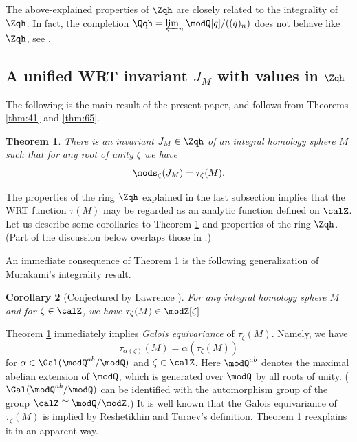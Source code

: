 \documentclass{amsart}
\numberwithin{equation}{section}
\numberwithin{figure}{section}
\theoremstyle{plain}
\newtheorem{theorem}{Theorem}[section]
\newtheorem{corollary}[theorem]{Corollary}
\theoremstyle{definition}
\theoremstyle{remark}
\begin{document}
The above-explained properties of $\Zqh$ are closely related to the
integrality of $\Zqh$.  In fact, the completion $\Qqh =
\varprojlim_{n}\modQ [q]/((q)_n)$ does not behave like $\Zqh$, see
\cite[Section 7.5]{H:cyclotomic}.
%
%
%
%
%
%
%
%
%
%
%

\subsection{A unified WRT invariant $J_M$ with values in $\Zqh$}
\label{sec:unif-wrt-invar-1}

The following is the main result of the present paper, and follows
from Theorems \ref{thm:41} and \ref{thm:65}.

\begin{theorem}
  \label{r40}
  There is an invariant $J_M\in \Zqh$ of an integral homology sphere $M$
  such that for any root of unity $\zeta $ we have
  \begin{equation}
    \label{e56}
    \mods _\zeta (J_M) = \tau _\zeta (M).
  \end{equation}
\end{theorem}

The properties of the ring $\Zqh$ explained in the last subsection
implies that the WRT function $\tau (M)$ may be regarded as an analytic
function defined on $\calZ$.  Let us describe some corollaries to
Theorem \ref{r40} and properties of the ring $\Zqh$.  (Part of the
discussion below overlaps those in \cite{H:rims2001,H:cyclotomic}.)

An immediate consequence of Theorem \ref{r40} is the following
generalization of Murakami's integrality result.

\begin{corollary}[Conjectured by Lawrence \cite{Lawrence:integrality}]
  \label{r14}
  For any integral homology sphere $M$ and for $\zeta \in \calZ$, we have
  $\tau _\zeta (M)\in \modZ [\zeta ]$.
\end{corollary}

Theorem \ref{r40} immediately implies {\em Galois equivariance} of
$\tau _\zeta (M)$.  Namely, we have
\begin{equation}
  \label{e67}
  \tau _{\alpha (\zeta )}(M)=\alpha (\tau _\zeta (M))
\end{equation}
for $\alpha \in \Gal(\modQ ^{ab}/\modQ )$ and $\zeta \in \calZ$.  Here $\modQ ^{ab}$ denotes
the maximal abelian extension of $\modQ $, which is generated over $\modQ $ by
all roots of unity.  ($\Gal(\modQ ^{ab}/\modQ )$ can be identified with the
automorphism group of the group $\calZ\cong\modQ /\modZ $.)  It is well known
that the Galois equivariance of $\tau _\zeta (M)$ is implied by Reshetikhin
and Turaev's definition.  Theorem \ref{r40} reexplains it in an
apparent way.
\end{document}
